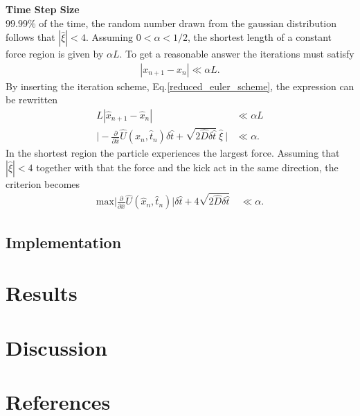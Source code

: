 \documentclass[11pt,a4paper]{article}
\begin{document}
\textbf{Time Step Size} \\
$99.99\%$ of the time, the random number drawn from the gaussian distribution follows that $ |\hat{\xi} | < 4$.
Assuming $0 < \alpha < 1/2$, the shortest length of a constant force region is given by $\alpha L$.
To get a reasonable answer the iterations must satisfy
\begin{align}
   |x_{n+1} -x_n| \ll \alpha L.
\end{align}
By inserting the iteration scheme, Eq.\eqref{reduced_euler_scheme}, the expression can be rewritten
\begin{align*}
   L| \hat{x}_{n+1} - \hat{x}_n| &\ll \alpha L \\
    \Big| - \frac{\partial}{\partial \hat{x}} \hat{U}(\hat{x}_n,\hat{t}_n) \delta \hat{t}
   		+  \sqrt{ 2 \hat{D} \delta \hat{t} } \: \hat{\xi} \: \Big| &\ll \alpha .
\end{align*}
In the shortest region the particle experiences the largest force. Assuming that $|\hat{\xi}| < 4$ together with that the force and the kick act in the same direction, the criterion becomes
\begin{align}
    \text{max}\Big|\frac{\partial}{\partial \hat{x}} \hat{U}(\hat{x}_n,\hat{t}_n)  \Big| 
    	\delta \hat{t}
   			+ 4 \sqrt{ 2 \hat{D} \delta \hat{t} }  \: &\ll \alpha.
\end{align}



\subsection{Implementation}

\section{Results}
\section{Discussion}
\section{References}

%
\end{document}
